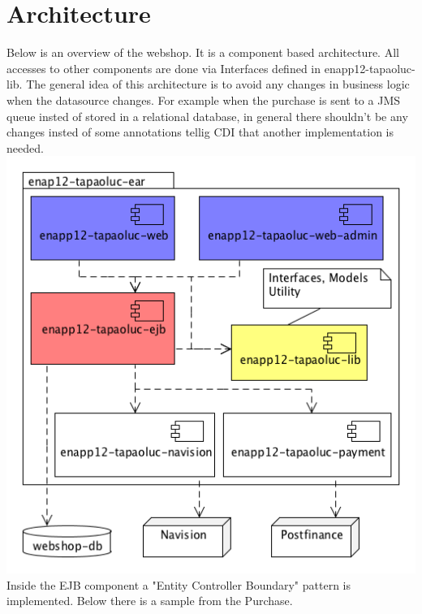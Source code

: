 \documentclass[11pt]{amsart}
\begin{document}
\section{Architecture}
Below is an overview of the webshop. It is a component based architecture. All accesses to other components are done via Interfaces defined in \textsf{enapp12-tapaoluc-lib}. The general idea of this architecture is to avoid any changes in business logic when the datasource changes. For example when the purchase is sent to a JMS queue insted of stored in a relational database, in general there shouldn't be any changes insted of some annotations tellig CDI that another implementation is needed.\\
\includegraphics[scale=0.8]{component-dia.png}\\
Inside the EJB component a "Entity Controller Boundary" pattern is implemented. Below there is a sample from the Purchase. \\
\end{document}

